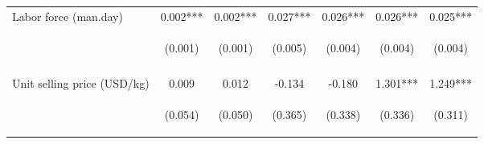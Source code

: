 \begin{center}
\begin{tabular}{lcccccc}
Labor force (man.day) & 0.002*** & 0.002*** & 0.027*** & 0.026*** & 0.026*** & 0.025*** \\
 & \begin{footnotesize}(0.001)\end{footnotesize} & \begin{footnotesize}(0.001)\end{footnotesize} & \begin{footnotesize}(0.005)\end{footnotesize} & \begin{footnotesize}(0.004)\end{footnotesize} & \begin{footnotesize}(0.004)\end{footnotesize} & \begin{footnotesize}(0.004)\end{footnotesize} \\
\vspace{4pt} & \begin{footnotesize}[0.003]\end{footnotesize} & \begin{footnotesize}[0.000]\end{footnotesize} & \begin{footnotesize}[0.000]\end{footnotesize} & \begin{footnotesize}[0.000]\end{footnotesize} & \begin{footnotesize}[0.000]\end{footnotesize} & \begin{footnotesize}[0.000]\end{footnotesize} \\
Unit selling price (USD/kg) & 0.009 & 0.012 & -0.134 & -0.180 & 1.301*** & 1.249*** \\
 & \begin{footnotesize}(0.054)\end{footnotesize} & \begin{footnotesize}(0.050)\end{footnotesize} & \begin{footnotesize}(0.365)\end{footnotesize} & \begin{footnotesize}(0.338)\end{footnotesize} & \begin{footnotesize}(0.336)\end{footnotesize} & \begin{footnotesize}(0.311)\end{footnotesize} \\

\end{tabular}
\end{center}
